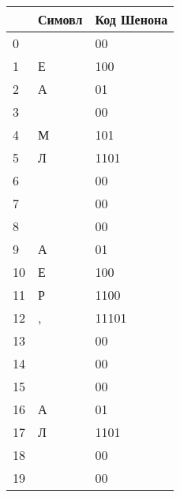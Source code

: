 \begin{tabular}{lll}
\toprule
 & Симовл & Код Шенона \\
\midrule
0 &   & 00 \\
1 & Е & 100 \\
2 & А & 01 \\
3 &   & 00 \\
4 & М & 101 \\
5 & Л & 1101 \\
6 &   & 00 \\
7 &   & 00 \\
8 &   & 00 \\
9 & А & 01 \\
10 & Е & 100 \\
11 & Р & 1100 \\
12 & , & 11101 \\
13 &   & 00 \\
14 &   & 00 \\
15 &   & 00 \\
16 & А & 01 \\
17 & Л & 1101 \\
18 &   & 00 \\
19 &   & 00 \\
\bottomrule
\end{tabular}
